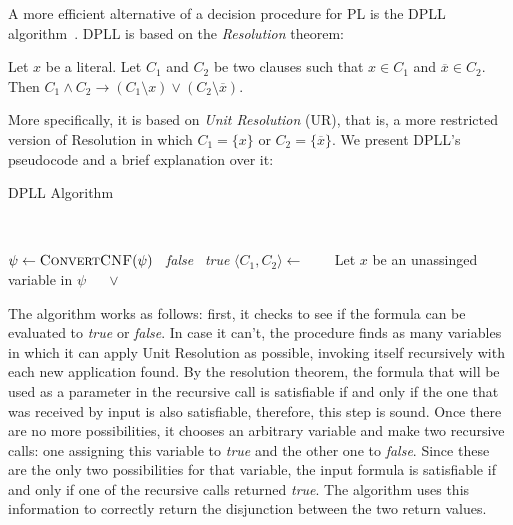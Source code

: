 A more efficient alternative of a decision procedure for PL is the DPLL algorithm~\cite{dpll}. DPLL is based on the \textit{Resolution} theorem:

\begin{theorem}[Resolution]
Let $x$ be a literal. Let $C_{1}$ and $C_{2}$ be two clauses such that $x \in C_{1}$ and $\overline x \in C_{2}$. Then $C_{1} \wedge C_{2} \rightarrow (C_{1} \setminus x) \vee (C_{2} \setminus \overline x)$.
\end{theorem}

More specifically, it is based on \textit{Unit Resolution} (UR), that is, a more restricted version of Resolution in which $C_{1} = \{x\}$ or $C_{2} = \{\overline x\}$. We present DPLL's pseudocode and a brief explanation over it:

\begin{algorithm}[H]
\caption{DPLL Algorithm}~\label{dpllAlgo}
\begin{algorithmic}[1]
\State $\psi \gets \Call{ConvertCNF}{\psi}$
  \State \Return~\textit{false}
  \State \Return~\textit{true}
\Else
    \State $\langle C_{1}, C_{2} \rangle \gets$  
    \State~\Return~
  \Else
    \State~Let $x$ be an unassinged variable in $\psi$
    \State~\Return~ $\vee$ 
  \EndIf
\EndIf
\EndFunction
\end{algorithmic}
\end{algorithm}

The algorithm works as follows: first, it checks to see if the formula can be evaluated to \textit{true} or \textit{false}. In case it can't, the procedure finds as many variables in which it can apply Unit Resolution as possible, invoking itself recursively with each new application found. By the resolution theorem, the formula that will be used as a parameter in the recursive call is satisfiable if and only if the one that was received by input is also satisfiable, therefore, this step is sound. Once there are no more possibilities, it chooses an arbitrary variable and make two recursive calls: one assigning this variable to \textit{true} and the other one to \textit{false}. Since these are the only two possibilities for that variable, the input formula is satisfiable if and only if one of the recursive calls returned \textit{true}. The algorithm uses this information to correctly return the disjunction between the two return values.

